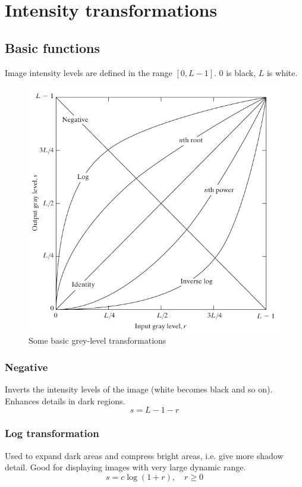 \section{Intensity transformations}

\subsection{Basic functions}
Image intensity levels are defined in the range $[0, L-1]$. $0$ is black, $L$ is white.
\begin{figure}[htbp]
    \centering
    \includegraphics[width=.8\linewidth]{images/basic-transformations}
    \caption{Some basic grey-level transformations}
    \label{fig:basic-transformations}
\end{figure}

\subsubsection{Negative}
Inverts the intensity levels of the image (white becomes black and so on). Enhances details in dark regions.
\begin{equation}
    s = L - 1 - r
\end{equation}

\subsubsection{Log transformation}
Used to expand dark areas and compress bright areas, i.e. give more shadow detail. Good for displaying images with very large dynamic range.
\begin{equation}
    s = c \log(1 + r), \quad r \geq 0
\end{equation}

